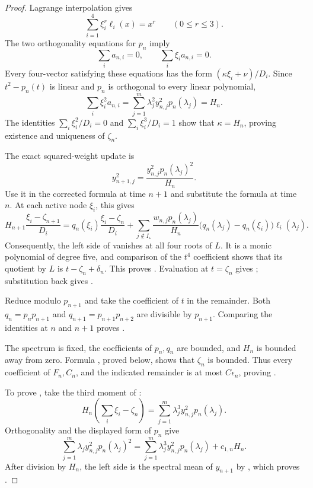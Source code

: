 \documentclass[11pt]{article}
\begin{document}
\begin{proof}
Lagrange interpolation gives
\[
 \sum_{i=1}^4\xi_i^r\ell_i(x)=x^r
 \qquad(0\leq r\leq3).
\tag{25}\label{eq:lagrange-moments}
\]
The two orthogonality equations for \(p_n\) imply
\[
 \sum_i a_{n,i}=0,\qquad \sum_i\xi_i a_{n,i}=0.
\]
Every four-vector satisfying these equations has the form
\((\kappa\xi_i+\nu)/D_i\).  Since \(t^2-p_n(t)\) is linear and \(p_n\)
is orthogonal to every linear polynomial,
\[
 \sum_i\xi_i^2a_{n,i}
 =\sum_{j=1}^m\lambda_j^2y_{n,j}^2p_n(\lambda_j)=H_n.
\]
The identities
\(\sum_i\xi_i^2/D_i=0\) and
\(\sum_i\xi_i^3/D_i=1\) show that \(\kappa=H_n\), proving existence and
uniqueness of \(\zeta_n\).

The exact squared-weight update is
\[
 y_{n+1,j}^2
 =\frac{y_{n,j}^2p_n(\lambda_j)^2}{H_n}.
\tag{26}\label{eq:squared-weight-update}
\]
Use it in the corrected formula at time \(n+1\) and substitute the formula
at time \(n\).  At each active node \(\xi_i\), this gives
\[
 H_{n+1}\frac{\xi_i-\zeta_{n+1}}{D_i}
 =
 q_n(\xi_i)\frac{\xi_i-\zeta_n}{D_i}
 +\sum_{j\notin I_\star}
 \frac{w_{n,j}p_n(\lambda_j)}{H_n}
 \bigl(q_n(\lambda_j)-q_n(\xi_i)\bigr)\ell_i(\lambda_j).
\]
Consequently, the left side of
 vanishes at all four roots of \(L\).
It is a monic polynomial of degree five, and comparison of the \(t^4\)
coefficient shows that its quotient by \(L\) is
\(t-\zeta_n+\delta_n\).  This proves
.  Evaluation at \(t=\zeta_n\) gives
; substitution back gives
.

Reduce  modulo \(p_{n+1}\) and take the
coefficient of \(t\) in the remainder.  Both
\(q_n=p_np_{n+1}\) and \(q_{n+1}=p_{n+1}p_{n+2}\) are divisible by
\(p_{n+1}\).  Comparing the identities at \(n\) and \(n+1\) proves
.

The spectrum is fixed, the coefficients of \(p_n,q_n\) are bounded, and
\(H_n\) is bounded away from zero.  Formula
, proved below, shows that \(\zeta_n\) is
bounded.  Thus every coefficient of \(F_n,C_n\), and the indicated
remainder is at most \(C\epsilon_n\), proving
.

To prove , take the third moment of
:
\[
 H_n\left(\sum_i\xi_i-\zeta_n\right)
 =\sum_{j=1}^m\lambda_j^3y_{n,j}^2p_n(\lambda_j).
\]
Orthogonality and the displayed form of \(p_n\) give
\[
 \sum_{j=1}^m\lambda_jy_{n,j}^2p_n(\lambda_j)^2
 =
 \sum_{j=1}^m\lambda_j^3y_{n,j}^2p_n(\lambda_j)+c_{1,n}H_n.
\]
After division by \(H_n\), the left side is the spectral mean of
\(y_{n+1}\) by , which proves
.
\end{proof}
\end{document}
